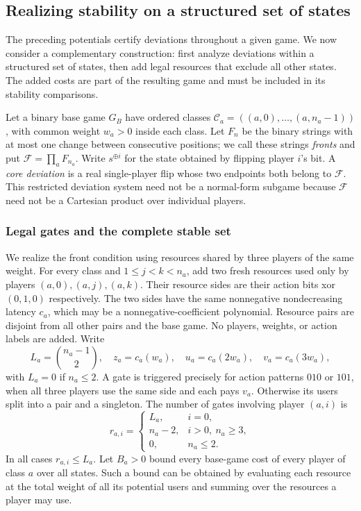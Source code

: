 \documentclass[manuscript,review,anonymous]{acmart}
\newcommand{\F}{\mathcal F}
\newcommand{\xor}{\mathbin{\oplus}}
\begin{document}
\subsection{Realizing stability on a structured set of states}\label{sec:repair}
The preceding potentials certify deviations throughout a given game. We now consider a complementary construction: first analyze deviations within a structured set of states, then add legal resources that exclude all other states. The added costs are part of the resulting game and must be included in its stability comparisons.

Let a binary base game $G_B$ have ordered classes $\mathcal C_a=((a,0),\ldots,(a,n_a-1))$, with common weight $w_a>0$ inside each class. Let $F_n$ be the binary strings with at most one change between consecutive positions; we call these strings \emph{fronts} and put $\F=\prod_aF_{n_a}$. Write $s^{\xor i}$ for the state obtained by flipping player $i$'s bit. A \emph{core deviation} is a real single-player flip whose two endpoints both belong to $\F$. This restricted deviation system need not be a normal-form subgame because $\F$ need not be a Cartesian product over individual players.

\subsubsection{Legal gates and the complete stable set}
We realize the front condition using resources shared by three players of the same weight.
For every class and $1\le j<k<n_a$, add two fresh resources used only by players $(a,0),(a,j),(a,k)$. Their resource sides are their action bits xor $(0,1,0)$ respectively. The two sides have the same nonnegative nondecreasing latency $c_a$, which may be a nonnegative-coefficient polynomial. Resource pairs are disjoint from all other pairs and the base game. No players, weights, or action labels are added. Write
\begin{equation}\label{eq:gateparameters}
 L_a=\binom{n_a-1}{2},\quad z_a=c_a(w_a),\quad
 u_a=c_a(2w_a),\quad v_a=c_a(3w_a),
\end{equation}
with $L_a=0$ if $n_a\le2$. A gate is triggered precisely for action patterns $010$ or $101$, when all three players use the same side and each pays $v_a$. Otherwise its users split into a pair and a singleton. The number of gates involving player $(a,i)$ is
\begin{equation}\label{eq:gatecounts}
 r_{a,i}=\begin{cases}
 L_a,&i=0,\\ n_a-2,&i>0,\ n_a\ge3,\\0,&n_a\le2.
 \end{cases}
\end{equation}
In all cases $r_{a,i}\le L_a$. Let $B_a>0$ bound every base-game cost of every player of class $a$ over all states. Such a bound can be obtained by evaluating each resource at the total weight of all its potential users and summing over the resources a player may use.
\end{document}
